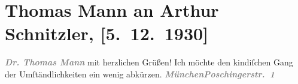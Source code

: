 

         \renewcommand{\erwaehnteOrte}{Orte: München, Poschingerstraße, Wien}
         \renewcommand{\erwaehnteWerke}{}
               \section[Thomas Mann an Arthur Schnitzler, {[}5. 12. 1930{]}]{ Thomas Mann an Arthur Schnitzler, {[}5. 12. 1930{]}}\nopagebreak{}\rehead{ }\begin{ledgroupsized}[t]{13cm}\normalsize\beginnumbering \toendnotes[C]{\smallbreak\pagebreak[2]} 
\pstart
           \noindent{}\centering{}{\pb}\textcolor{gray}{\textbf{\emph{Dr. Thomas Mann}}}\pend
           \pstart
           \noindent{}mit herzlichen Grüßen! Ich möchte den kindiſchen Gang der Umſtändlichkeiten ein
                    wenig abkürzen.\pend
           \pstart
           \textcolor{gray}{\textbf{\emph{München}}}\hfill \textcolor{gray}{\textbf{\emph{Poschingerstr. 1}}}\pend
           
         
         \endnumbering{}\end{ledgroupsized}  \newcommand{\dateiname}{L02540}\newcommand{\titel}{Thomas Mann an Arthur Schnitzler, [5. 12. 1930]}\newcommand{\editorInnen}{Martin Anton Müller und Gerd-Hermann Susen}
      